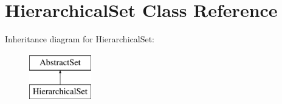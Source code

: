 \hypertarget{classHierarchicalSet}{\section{Hierarchical\-Set Class Reference}
\label{classHierarchicalSet}
}
Inheritance diagram for Hierarchical\-Set\-:\begin{figure}[H]
\begin{center}
\leavevmode
\includegraphics[height=2.000000cm]{classHierarchicalSet}
\end{center}
\end{figure}
